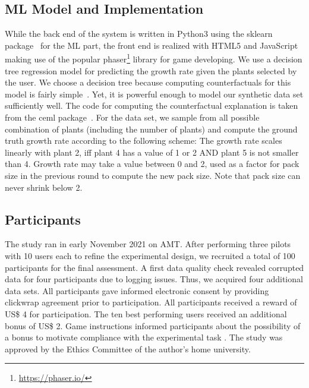 \subsection{ML Model and Implementation}
While the back end of the system is written in Python3 using the sklearn package~\citep{pedregosa_scikit-learn_2011} for the \gls{ML} part, the front end is realized with HTML5 and JavaScript making use of the popular phaser\footnote{\url{https://phaser.io/}} library for game developing.
We use a decision tree regression model for predicting the growth rate given the plants selected by the user. 
We choose a decision tree because computing counterfactuals for this model is fairly simple~\citep{artelt_computation_2019}.
Yet, it is powerful enough to model our synthetic data set sufficiently well.
The code for computing the counterfactual explanation is taken from the ceml package~\citep{artelt_ceml_2019}.
For the data set, we sample from all possible combination of plants (including the number of plants) and compute the ground truth growth rate according to the following scheme:
The growth rate scales linearly with plant 2, iff plant 4 has a value of 1 or 2 AND plant 5 is not smaller than 4.
Growth rate may take a value between 0 and 2, used as a factor for pack size in the previous round to compute the new pack size.
Note that pack size can never shrink below 2.

\subsection{Participants}

The study ran in early November 2021 on \gls{AMT}.
After performing three pilots with 10 users each to refine the experimental design, we recruited a total of 100 participants for the final assessment. %
A first data quality check revealed corrupted data for four participants due to logging issues. Thus, we acquired four additional data sets. 
All participants gave informed electronic consent by providing clickwrap agreement prior to participation.
All participants received a reward of US\$ 4 for participation. 
The ten best performing users received an additional bonus of US\$ 2. 
Game instructions informed participants about the possibility of a bonus to motivate compliance with the experimental task \citep{bansal_updates_2019}.
The study was approved by the Ethics Committee of the author's home university.

